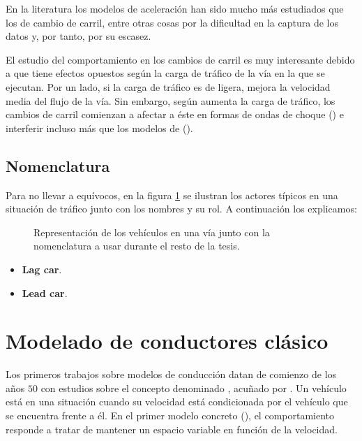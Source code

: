 En la literatura los modelos de aceleración han sido mucho más estudiados que los de cambio de carril, entre otras cosas por la dificultad en la captura de los datos y, por tanto, por su escasez.

El estudio del comportamiento en los cambios de carril es muy interesante debido a que tiene efectos opuestos según la carga de tráfico de la vía en la que se ejecutan. Por un lado, si la carga de tráfico es de ligera, mejora la velocidad media del flujo de la vía. Sin embargo, según aumenta la carga de tráfico, los cambios de carril comienzan a afectar a éste en formas de ondas de choque (\cite{Sasoh2002, Jin2006}) e interferir incluso más que los modelos de \textit{} (\cite{Laval2006}).

\subsection{Nomenclatura}

Para no llevar a equívocos, en la figura \ref{fig:lane-representation-with-namings} se ilustran los actores típicos en una situación de tráfico junto con los nombres y su rol. A continuación los explicamos:

\begin{figure}
	\caption{Representación de los vehículos en una vía junto con la nomenclatura a usar durante el resto de la tesis.}
	\label{fig:lane-representation-with-namings}
\end{figure}

\begin{itemize}
	\item \textbf{Lag car}.
	\item \textbf{Lead car}.
\end{itemize}

\section{Modelado de conductores clásico}

Los primeros trabajos sobre modelos de conducción datan de comienzo de los años $50$ con estudios sobre el concepto denominado \textbf{}, acuñado por \cite{reuschel1950fahrzeugbewegungen}. Un vehículo está en una situación  cuando su velocidad está condicionada por el vehículo que se encuentra frente a él. En el primer modelo concreto (\cite{Pipes1953}), el comportamiento responde a tratar de mantener un espacio variable en función de la velocidad.

